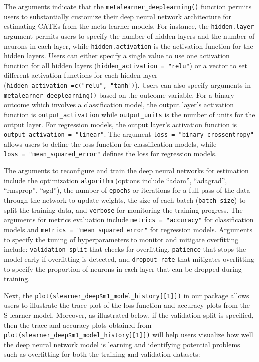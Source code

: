 The arguments indicate that the \texttt{metalearner\_deeplearning()} function
permits users to substantially customize their deep neural network
architecture for estimating CATEs from the meta-learner models. For
instance, the \texttt{hidden.layer} argument permits users to specify the
number of hidden layers and the number of neurons in each layer, while
\texttt{hidden.activation} is the activation function for the hidden layers.
Users can either specify a single value to use one activation function
for all hidden layers (\texttt{hidden\_activation\ =\ "relu"}) or a vector to set
different activation functions for each hidden layer
(\texttt{hidden\_activation\ =c("relu",\ "tanh")}). Users can also specify
arguments in \texttt{metalearner\_deeplearning()} based on the outcome variable.
For a binary outcome which involves a classification model, the output
layer's activation function is \texttt{output\_activation} while \texttt{output\_units}
is the number of units for the output layer. For regression models, the
output layer's activation function is \texttt{output\_activation\ =\ "linear"}.
The argument \texttt{loss\ =\ "binary\_crossentropy"} allows users to define the
loss function for classification models, while
\texttt{loss\ =\ "mean\_squared\_error"} defines the loss for regression models.

The arguments to reconfigure and train the deep neural networks for
estimation include the optimization \texttt{algorithm} (options include ``adam'',
``adagrad'', ``rmsprop'', ``sgd''), the number of \texttt{epochs} or iterations for a
full pass of the data through the network to update weights, the size of
each batch (\texttt{batch\_size}) to split the training data, and \texttt{verbose} for
monitoring the training progress. The arguments for metrics evaluation
include \texttt{metrics\ =\ "accuracy"} for classification models and
\texttt{metrics\ =\ "mean\ squared\ error"} for regression models. Arguments to
specify the tuning of hyperparameters to monitor and mitigate
overfitting include: \texttt{validation\_split} that checks for overfitting,
\texttt{patience} that stops the model early if overfitting is detected, and \texttt{dropout\_rate}
that mitigates overfitting to specify the proportion of neurons in each
layer that can be dropped during training.

Next, the \texttt{plot(slearner\_deep\$m1\_model\_history{[}{[}1{]}{]})} in our
 package allows users to illustrate the trace
plot of the loss function and accuracy plots from the S-learner model.
Moreover, as illustrated below, if the validation split is specified,
then the trace and accuracy plots obtained from
\texttt{plot(slearner\_deep\$m1\_model\_history{[}{[}1{]}{]})} will help users visualize
how well the deep neural network model is learning and identifying
potential problems such as overfitting for both the training and
validation datasets:

